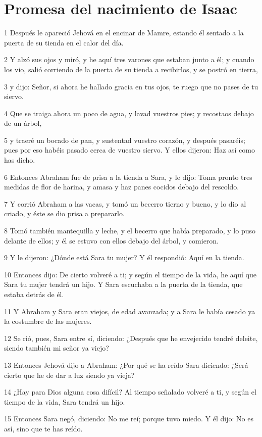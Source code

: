 \section*{Promesa del nacimiento de Isaac}

\par 1 Después le apareció Jehová en el encinar de Mamre, estando él sentado a la puerta de su tienda en el calor del día.
\par 2 Y alzó sus ojos y miró, y he aquí tres varones que estaban junto a él; y cuando los vio, salió corriendo de la puerta de su tienda a recibirlos, y se postró en tierra,
\par 3 y dijo: Señor, si ahora he hallado gracia en tus ojos, te ruego que no pases de tu siervo.
\par 4 Que se traiga ahora un poco de agua, y lavad vuestros pies; y recostaos debajo de un árbol,
\par 5 y traeré un bocado de pan, y sustentad vuestro corazón, y después pasaréis; pues por eso habéis pasado cerca de vuestro siervo. Y ellos dijeron: Haz así como has dicho.
\par 6 Entonces Abraham fue de prisa a la tienda a Sara, y le dijo: Toma pronto tres medidas de flor de harina, y amasa y haz panes cocidos debajo del rescoldo.
\par 7 Y corrió Abraham a las vacas, y tomó un becerro tierno y bueno, y lo dio al criado, y éste se dio prisa a prepararlo.
\par 8 Tomó también mantequilla y leche, y el becerro que había preparado, y lo puso delante de ellos; y él se estuvo con ellos debajo del árbol, y comieron.
\par 9 Y le dijeron: ¿Dónde está Sara tu mujer? Y él respondió: Aquí en la tienda.
\par 10 Entonces dijo: De cierto volveré a ti; y según el tiempo de la vida, he aquí que Sara tu mujer tendrá un hijo. Y Sara escuchaba a la puerta de la tienda, que estaba detrás de él.
\par 11 Y Abraham y Sara eran viejos, de edad avanzada; y a Sara le había cesado ya la costumbre de las mujeres.
\par 12 Se rió, pues, Sara entre sí, diciendo: ¿Después que he envejecido tendré deleite, siendo también mi señor ya viejo?
\par 13 Entonces Jehová dijo a Abraham: ¿Por qué se ha reído Sara diciendo: ¿Será cierto que he de dar a luz siendo ya vieja?
\par 14 ¿Hay para Dios alguna cosa difícil? Al tiempo señalado volveré a ti, y según el tiempo de la vida, Sara tendrá un hijo.
\par 15 Entonces Sara negó, diciendo: No me reí; porque tuvo miedo. Y él dijo: No es así, sino que te has reído.

